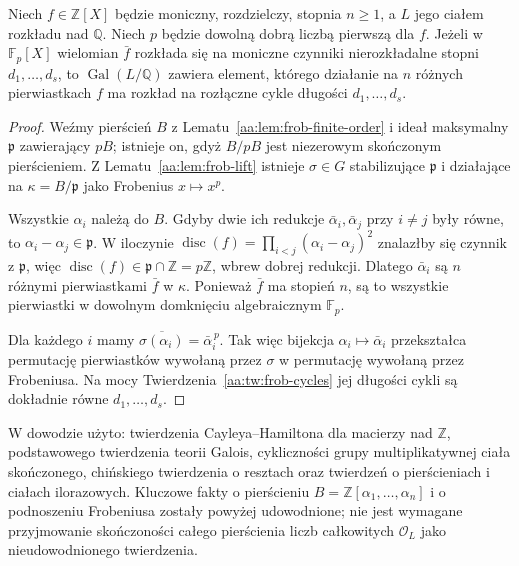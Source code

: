 \begin{twierdzenie}\label{aa:tw:dedekind-cycle}
Niech $f\in\mathbb Z[X]$ będzie moniczny, rozdzielczy,
stopnia $n\ge1$, a $L$ jego ciałem rozkładu nad $\mathbb Q$.
Niech $p$ będzie dowolną dobrą liczbą pierwszą dla $f$.
Jeżeli w $\mathbb F_p[X]$ wielomian $\bar f$ rozkłada się
na moniczne czynniki nierozkładalne stopni
$d_1,\ldots,d_s$, to $\operatorname{Gal}(L/\mathbb Q)$
zawiera element, którego działanie na $n$ różnych
pierwiastkach $f$ ma rozkład na rozłączne cykle
długości $d_1,\ldots,d_s$.
\end{twierdzenie}
\begin{proof}
Weźmy pierścień $B$ z Lematu~\ref{aa:lem:frob-finite-order}
i ideał maksymalny $\mathfrak p$ zawierający $pB$;
istnieje on, gdyż $B/pB$ jest niezerowym skończonym pierścieniem.
Z Lematu~\ref{aa:lem:frob-lift} istnieje $\sigma\in G$
stabilizujące $\mathfrak p$ i działające na
$\kappa=B/\mathfrak p$ jako Frobenius $x\mapsto x^p$.

Wszystkie $\alpha_i$ należą do $B$.
Gdyby dwie ich redukcje $\bar\alpha_i,\bar\alpha_j$
przy $i\ne j$ były równe, to $\alpha_i-\alpha_j\in\mathfrak p$.
W iloczynie
$\operatorname{disc}(f)=\prod_{i<j}(\alpha_i-\alpha_j)^2$
znalazłby się czynnik z $\mathfrak p$, więc
$\operatorname{disc}(f)\in\mathfrak p\cap\mathbb Z=p\mathbb Z$,
wbrew dobrej redukcji. Dlatego $\bar\alpha_i$ są
$n$ różnymi pierwiastkami $\bar f$ w $\kappa$.
Ponieważ $\bar f$ ma stopień $n$, są to wszystkie pierwiastki
w dowolnym domknięciu algebraicznym $\mathbb F_p$.

Dla każdego $i$ mamy
$\overline{\sigma(\alpha_i)}=\bar\alpha_i^{\,p}$.
Tak więc bijekcja $\alpha_i\mapsto\bar\alpha_i$
przekształca permutację pierwiastków wywołaną przez $\sigma$
w permutację wywołaną przez Frobeniusa.
Na mocy Twierdzenia~\ref{aa:tw:frob-cycles} jej długości cykli
są dokładnie równe $d_1,\ldots,d_s$.
\end{proof}

\begin{uwaga}\label{aa:uw:dedekind-prereq}
W dowodzie użyto: twierdzenia Cayleya–Hamiltona dla macierzy
nad $\mathbb Z$, podstawowego twierdzenia teorii Galois,
cykliczności grupy multiplikatywnej ciała skończonego,
chińskiego twierdzenia o resztach oraz twierdzeń o pierścieniach
i ciałach ilorazowych. Kluczowe fakty o pierścieniu
$B=\mathbb Z[\alpha_1,\ldots,\alpha_n]$ i o podnoszeniu
Frobeniusa zostały powyżej udowodnione; nie jest wymagane
przyjmowanie skończoności całego pierścienia liczb całkowitych
$\mathcal O_L$ jako nieudowodnionego twierdzenia.
\end{uwaga}

